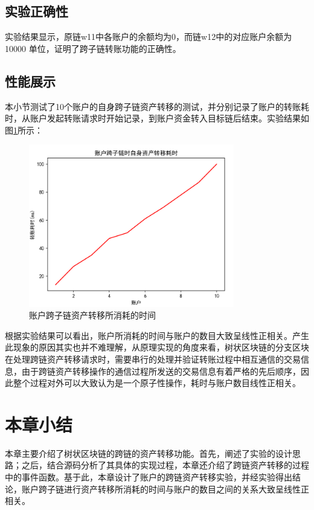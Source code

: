 \subsection{实验正确性}

实验结果显示，原链w11中各账户的余额均为0，而链w12中的对应账户余额为10000 单位，证明了跨子链转账功能的正确性。

\subsection{性能展示}

本小节测试了10个账户的自身跨子链资产转移的测试，并分别记录了账户的转账耗时，从账户发起转账请求时开始记录，到账户资金转入目标链后结束。实验结果如图\ref{fig:账户跨子链资产转移所消耗的时间}所示：

\begin{figure}
	\centering
	\includegraphics[width=0.8\textwidth]{figures/账户跨子链资产转移所消耗的时间.png}
	\caption{账户跨子链资产转移所消耗的时间}
	\label{fig:账户跨子链资产转移所消耗的时间}
\end{figure}

根据实验结果可以看出，账户所消耗的时间与账户的数目大致呈线性正相关。产生此现象的原因其实也并不难理解，从原理实现的角度来看，树状区块链的分支区块在处理跨链资产转移请求时，需要串行的处理并验证转账过程中相互通信的交易信息，由于跨链资产转移操作的通信过程所发送的交易信息有着严格的先后顺序，因此整个过程对外可以大致认为是一个原子性操作，耗时与账户数目线性正相关。

\section{本章小结}

本章主要介绍了树状区块链的跨链的资产转移功能。首先，阐述了实验的设计思路；之后，结合源码分析了其具体的实现过程，本章还介绍了跨链资产转移的过程中的事件函数。基于此，本章设计了账户的跨链资产转移实验，并经实验得出结论，账户跨子链进行资产转移所消耗的时间与账户的数目之间的关系大致呈线性正相关。

